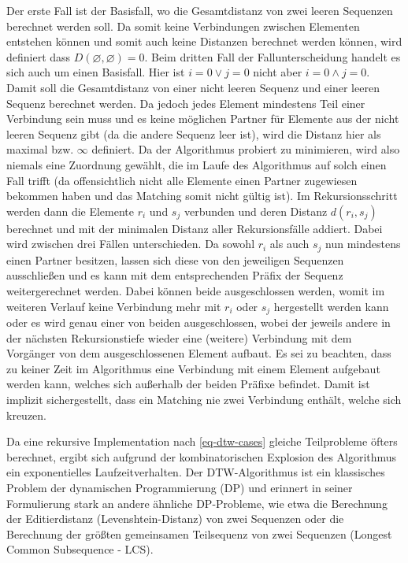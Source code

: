 \documentclass{whswinvcbook}
\begin{document}
Der erste Fall ist der Basisfall, wo die Gesamtdistanz von zwei leeren Sequenzen berechnet werden soll. Da somit keine Verbindungen zwischen Elementen entstehen können und somit auch keine Distanzen berechnet werden können, wird definiert dass $D(\varnothing,\varnothing)=0$. Beim dritten Fall der Fallunterscheidung handelt es sich auch um einen Basisfall. Hier ist $i=0\lor j=0$ nicht aber $i=0\land j=0$. Damit soll die Gesamtdistanz von einer nicht leeren Sequenz und einer leeren Sequenz berechnet werden. Da jedoch jedes Element mindestens Teil einer Verbindung sein muss und es keine möglichen Partner für Elemente aus der nicht leeren Sequenz gibt (da die andere Sequenz leer ist), wird die Distanz hier als maximal bzw. $\infty$ definiert. Da der Algorithmus probiert zu minimieren, wird also niemals eine Zuordnung gewählt, die im Laufe des Algorithmus auf solch einen Fall trifft (da offensichtlich nicht alle Elemente einen Partner zugewiesen bekommen haben und das Matching somit nicht gültig ist). Im Rekursionsschritt werden dann die Elemente $r_i$ und $s_j$ verbunden und deren Distanz $d(r_i,s_j)$ berechnet und mit der minimalen Distanz aller Rekursionsfälle addiert. Dabei wird zwischen drei Fällen unterschieden. Da sowohl $r_i$ als auch $s_j$ nun mindestens einen Partner besitzen, lassen sich diese von den jeweiligen Sequenzen ausschließen und es kann mit dem entsprechenden Präfix der Sequenz weitergerechnet werden. Dabei können beide ausgeschlossen werden, womit im weiteren Verlauf keine Verbindung mehr mit $r_i$ oder $s_j$ hergestellt werden kann oder es wird genau einer von beiden ausgeschlossen, wobei der jeweils andere in der nächsten Rekursionstiefe wieder eine (weitere) Verbindung mit dem Vorgänger von dem ausgeschlossenen Element aufbaut. Es sei zu beachten, dass zu keiner Zeit im Algorithmus eine Verbindung mit einem Element aufgebaut werden kann, welches sich außerhalb der beiden Präfixe befindet. Damit ist implizit sichergestellt, dass ein Matching nie zwei Verbindung enthält, welche sich kreuzen.

Da eine rekursive Implementation nach \ref{eq-dtw-cases} gleiche Teilprobleme öfters berechnet, ergibt sich aufgrund der kombinatorischen Explosion des Algorithmus ein exponentielles Laufzeitverhalten. Der DTW-Algorithmus ist ein klassisches Problem der dynamischen Programmierung (DP) und erinnert in seiner Formulierung stark an andere ähnliche DP-Probleme, wie etwa die Berechnung der Editierdistanz (Levenshtein-Distanz) von zwei Sequenzen oder die Berechnung der größten gemeinsamen Teilsequenz von zwei Sequenzen (Longest Common Subsequence - LCS).
\end{document}
